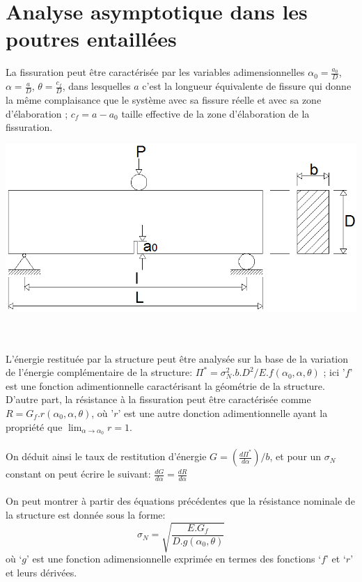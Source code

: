 \documentclass{DGC_M2_report}
\begin{document}
\section{Analyse asymptotique dans les poutres entaillées}
La fissuration peut être caractérisée
par les variables adimensionnelles $\alpha_0 = \frac{a_0}{D}$, $\alpha = \frac{a}{D}$, $\theta = \frac{c_f}{D}$, dans lesquelles \og$a$\fg{} c'est la longueur équivalente de fissure qui donne la même complaisance que le système avec sa fissure réelle et
avec sa zone d'élaboration ; $c_f=a-a_0$ taille effective de la zone d'élaboration de la fissuration.
\\
\begin{center}
\includegraphics[scale=0.5]{figure1}
\end{center}
\\\\
L'énergie restituée par la structure peut être analysée sur la base de la variation de
l'énergie complémentaire de la structure: $\Pi^* = \sigma_{N}^{2}.b.D^2/E.f(\alpha_0, \alpha, \theta)$ ; ici '$f$' est une fonction adimentionnelle caractérisant la géométrie de la structure. D'autre part, la résistance à la
fissuration peut être caractérisée comme $R=G_f.r(\alpha_0, \alpha, \theta)$, où '$r$' est une autre donction adimentionnelle ayant la propriété que $\lim_{\alpha \to \alpha_0} r = 1$.\\\\
On déduit ainsi le taux de restitution d'énergie $G = (\frac{d\Pi^*}{d\alpha})/b$, et pour un $\sigma_N$ constant on peut écrire le suivant: $\frac{dG}{d\alpha} = \frac{dR}{d\alpha}$
\\\\
On peut montrer à partir des équations précédentes que la résistance nominale de la
structure est donnée sous la forme: \[\sigma_N = \sqrt{\frac{E.G_f}{D.g(\alpha_0, \theta)}}\]
où ‘$g$' est une fonction adimensionnelle
exprimée en termes des fonctions ‘$f$' et ‘$r$' et leurs dérivées.
\end{document}
